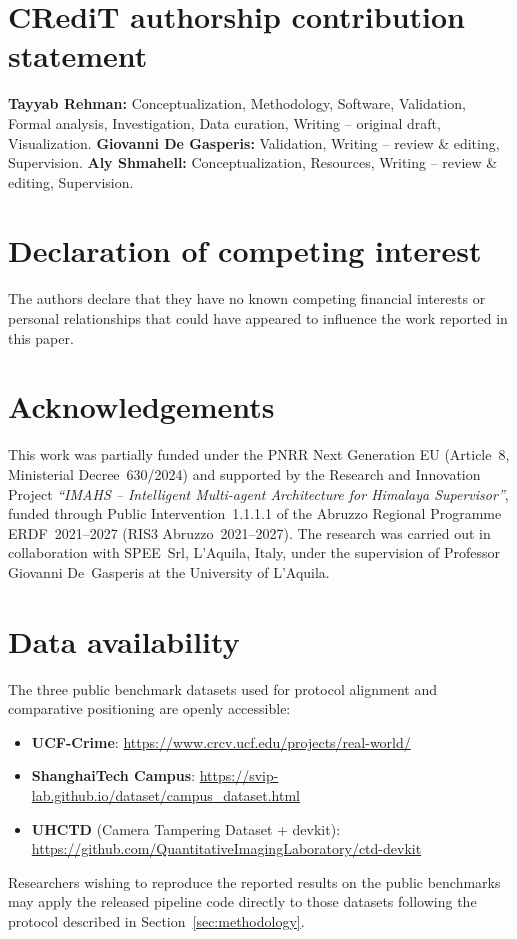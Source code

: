 \documentclass[a4paper,fleqn]{cas-dc}
\begin{document}
\section*{CRediT authorship contribution statement}

\textbf{Tayyab Rehman:} Conceptualization, Methodology, Software,
Validation, Formal analysis, Investigation, Data curation, Writing
-- original draft, Visualization.
\textbf{Giovanni De Gasperis:} Validation, Writing -- review \& editing,
Supervision.
\textbf{Aly Shmahell:} Conceptualization, Resources, Writing -- review
\& editing, Supervision.

\section*{Declaration of competing interest}

The authors declare that they have no known competing financial interests
or personal relationships that could have appeared to influence the work
reported in this paper.

\section*{Acknowledgements}

This work was partially funded under the PNRR Next Generation EU
(Article~8, Ministerial Decree~630/2024) and supported by the Research
and Innovation Project \emph{``IMAHS -- Intelligent Multi-agent
Architecture for Himalaya Supervisor''}, funded through Public
Intervention~1.1.1.1 of the Abruzzo Regional Programme
ERDF~2021--2027 (RIS3 Abruzzo~2021--2027). The research was carried
out in collaboration with SPEE~Srl, L'Aquila, Italy, under the
supervision of Professor Giovanni De~Gasperis at the University of
L'Aquila.

\section*{Data availability}

The three public benchmark datasets used for protocol alignment and
comparative positioning are openly accessible:
\begin{itemize}
  \item \textbf{UCF-Crime}:
    \url{https://www.crcv.ucf.edu/projects/real-world/}~\citep{sultani2018realworld}
  \item \textbf{ShanghaiTech Campus}:
    \url{https://svip-lab.github.io/dataset/campus_dataset.html}~\citep{georgescu2021anomaly}
  \item \textbf{UHCTD} (Camera Tampering Dataset + devkit):
    \url{https://github.com/QuantitativeImagingLaboratory/ctd-devkit}
\end{itemize}
Researchers wishing to reproduce the reported results on the public
benchmarks may apply the released pipeline code directly to those
datasets following the protocol described in
Section~\ref{sec:methodology}.
\end{document}
